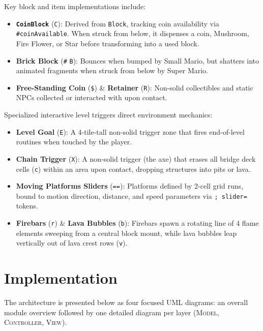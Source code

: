 \documentclass[12pt, a4paper]{article}
\begin{document}
Key block and item implementations include:
\begin{itemize}
\item \textbf{\texttt{CoinBlock}} (\texttt{C}): Derived from \texttt{Block}, tracking coin availability via \texttt{\#coinAvailable}. When struck from below, it dispenses a coin, Mushroom, Fire Flower, or Star before transforming into a used block.
\item \textbf{Brick Block} (\texttt{\#} \/ \texttt{B}): Bounces when bumped by Small Mario, but shatters into animated fragments when struck from below by Super Mario.
\item \textbf{Free-Standing Coin} (\texttt{\$}) \& \textbf{Retainer} (\texttt{R}): Non-solid collectibles and static NPCs collected or interacted with upon contact.
\end{itemize}

Specialized interactive level triggers direct environment mechanics:
\begin{itemize}
\item \textbf{Level Goal} (\texttt{E}): A 4-tile-tall non-solid trigger zone that fires end-of-level routines when touched by the player.
\item \textbf{Chain Trigger} (\texttt{X}): A non-solid trigger (the axe) that erases all bridge deck cells (\texttt{c}) within an area upon contact, dropping structures into pits or lava.
\item \textbf{Moving Platforms \/ Sliders} (\texttt{==}): Platforms defined by 2-cell grid runs, bound to motion direction, distance, and speed parameters via \texttt{; slider=} tokens.
\item \textbf{Firebars} (\texttt{r}) \& \textbf{Lava Bubbles} (\texttt{b}): Firebars spawn a rotating line of 4 flame elements sweeping from a central block mount, while lava bubbles leap vertically out of lava crest rows (\texttt{v}).
\end{itemize}

\newpage

\section{Implementation}

The architecture is presented below as four focused UML diagrams: an overall module overview followed by one detailed diagram per layer (\textsc{Model}, \textsc{Controller}, \textsc{View}).
\end{document}
